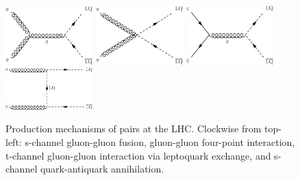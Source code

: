 \begin{figure}[H]
    \centering
    \includegraphics[width=0.3\textwidth]{Images/Theory/LQLQProduction_1.pdf}\hspace{0.1\textwidth}
    \includegraphics[width=0.3\textwidth]{Images/Theory/LQLQProduction_3.pdf}\vspace{0.05\textwidth}
    \includegraphics[width=0.3\textwidth]{Images/Theory/LQLQProduction_2.pdf}\hspace{0.1\textwidth}
    \includegraphics[width=0.3\textwidth]{Images/Theory/LQLQProduction_4.pdf}\vspace{0.05\textwidth}
    \caption{Production mechanisms of \HepProcess{\LQ\LQbar} pairs at the LHC. Clockwise from top-left: s-channel gluon-gluon fusion, gluon-gluon four-point interaction, t-channel gluon-gluon interaction via leptoquark exchange, and s-channel quark-antiquark annihilation.}
    \label{fig:LQpairprod}
\end{figure}